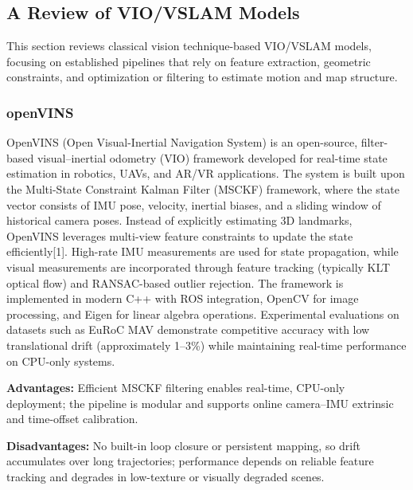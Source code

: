 
\subsection{A Review of VIO/VSLAM Models}
This section reviews classical vision technique-based VIO/VSLAM models, focusing on established pipelines that rely on feature extraction, geometric constraints, and optimization or filtering to estimate motion and map structure.

\subsubsection{openVINS}
OpenVINS (Open Visual-Inertial Navigation System) is an open-source, filter-based visual–inertial odometry (VIO) framework developed for real-time state estimation in robotics, UAVs, and AR/VR applications. The system is built upon the Multi-State Constraint Kalman Filter (MSCKF) framework, where the state vector consists of IMU pose, velocity, inertial biases, and a sliding window of historical camera poses. Instead of explicitly estimating 3D landmarks, OpenVINS leverages multi-view feature constraints to update the state efficiently[1]. High-rate IMU measurements are used for state propagation, while visual measurements are incorporated through feature tracking (typically KLT optical flow) and RANSAC-based outlier rejection. The framework is implemented in modern C++ with ROS integration, OpenCV for image processing, and Eigen for linear algebra operations. Experimental evaluations on datasets such as EuRoC MAV demonstrate competitive accuracy with low translational drift (approximately 1–3\%)\cite{openvins} while maintaining real-time performance on CPU-only systems.

\noindent\textbf{Advantages:} Efficient MSCKF filtering enables real-time, CPU-only deployment; the pipeline is modular and supports online camera--IMU extrinsic and time-offset calibration.

\noindent\textbf{Disadvantages:} No built-in loop closure or persistent mapping, so drift accumulates over long trajectories; performance depends on reliable feature tracking and degrades in low-texture or visually degraded scenes.


